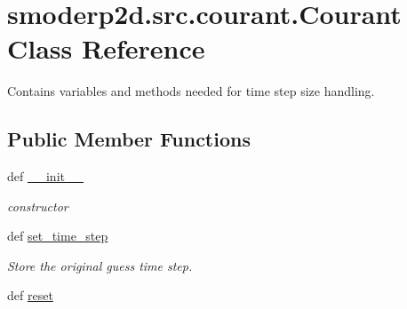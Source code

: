 \hypertarget{classsmoderp2d_1_1src_1_1courant_1_1Courant}{\section{smoderp2d.\-src.\-courant.\-Courant Class Reference}
\label{classsmoderp2d_1_1src_1_1courant_1_1Courant}
}


Contains variables and methods needed for time step size handling.  


\subsection*{Public Member Functions}
\begin{DoxyCompactItemize}
\item 
\hypertarget{classsmoderp2d_1_1src_1_1courant_1_1Courant_a629841e2699d232acff8b2285dd1dcd7}{def \hyperlink{classsmoderp2d_1_1src_1_1courant_1_1Courant_a629841e2699d232acff8b2285dd1dcd7}{\-\_\-\-\_\-init\-\_\-\-\_\-}}\label{classsmoderp2d_1_1src_1_1courant_1_1Courant_a629841e2699d232acff8b2285dd1dcd7}

\begin{DoxyCompactList}\small\item\em constructor \end{DoxyCompactList}\item 
\hypertarget{classsmoderp2d_1_1src_1_1courant_1_1Courant_ae788349453919f497d8712ac4a8e12ef}{def \hyperlink{classsmoderp2d_1_1src_1_1courant_1_1Courant_ae788349453919f497d8712ac4a8e12ef}{set\-\_\-time\-\_\-step}}\label{classsmoderp2d_1_1src_1_1courant_1_1Courant_ae788349453919f497d8712ac4a8e12ef}

\begin{DoxyCompactList}\small\item\em Store the original guess time step. \end{DoxyCompactList}\item 
\hypertarget{classsmoderp2d_1_1src_1_1courant_1_1Courant_a9ebe11436dc1c1efa6c2a2f4fd2733f2}{def \hyperlink{classsmoderp2d_1_1src_1_1courant_1_1Courant_a9ebe11436dc1c1efa6c2a2f4fd2733f2}{reset}}\label{classsmoderp2d_1_1src_1_1courant_1_1Courant_a9ebe11436dc1c1efa6c2a2f4fd2733f2}


\end{DoxyCompactItemize}
